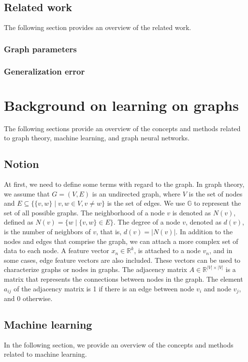 \documentclass{article}
\begin{document}
\subsection{Related work}
The following section provides an overview of the related work.

\subsubsection{Graph parameters}


\subsubsection{Generalization error}





\section{Background on learning on graphs}
The following sections provide an overview of the concepts and methods related to graph theory, machine learning, and graph neural networks. 

\subsection{Notion}
At first, we need to define some terms with regard to the graph. In graph theory, we assume that $G=(V,E)$ is an undirected graph, where $V$ is the set of nodes and $E  \subseteq \{\{v,w\}\mid v,w \in V , v \neq w\}$ is the set of edges. We use $\mathbb{G}$ to represent the set of all possible graphs. The neighborhood of a node $v$ is denoted as $N(v)$, defined as $N(v) = \{w \mid \{v,w\} \in E\}$. The degree of a node $v$, denoted as $d(v)$, is the number of neighbors of $v$, that is, $d(v) = |N(v)|$. In addition to the nodes and edges that comprise the graph, we can attach a more complex set of data to each node.  A feature vector $x_n\in \mathbb{R}^k$, is attached to a node $v_n$, and in some cases, edge feature vectors are also included. These vectors can be used to characterize graphs or nodes in graphs. The adjacency matrix $A \in \mathbb{R}^{|V| \times |V|}$ is a matrix that represents the connections between nodes in the graph. The element $a_{ij}$ of the adjacency matrix is 1 if there is an edge between node $v_i$ and node $v_j$, and 0 otherwise.

\subsection{Machine learning}
In the following section, we provide an overview of the concepts and methods related to machine learning. 
\end{document}
